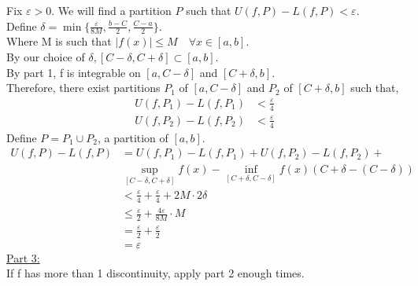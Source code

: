 \documentclass[12pt]{article}
\begin{document}
\begin{prf}{}
Fix \(\varepsilon > 0\). We will find a partition \(P\) such that \(U(f, P) - L(f, P) < \varepsilon\).\\
Define \(\delta = \min\{\frac{\varepsilon}{8M}, \frac{b - C}{2}, \frac{C - a}{2}\}\).\\
Where M is such that \(|f(x)| \le M \quad \forall x \in [a, b] \).\\
By our choice of \(\delta, [C-\delta, C+\delta] \subset [a, b]\).\\
By part 1, f is integrable on \([a, C-\delta]\) and \([C+\delta, b]\).\\
Therefore, there exist partitions \(P_1\) of \([a, C-\delta]\) and \(P_2\) of \([C+\delta, b]\) such that,
\begin{align*}
    U(f, P_1) - L(f, P_1) &< \frac{\varepsilon}{4}\\
    U(f, P_2) - L(f, P_2) &< \frac{\varepsilon}{4}
\end{align*}
Define \(P = P_1 \cup P_2\), a partition of \([a, b]\).\\
\begin{align*}
    U(f, P) - L(f, P) &= U(f, P_1) - L(f, P_1) + U(f, P_2) - L(f, P_2) +\\ &\displaystyle\sup_{[C-\delta, C+\delta]}f(x) - \displaystyle\inf_{[C+\delta, C-\delta]}f(x)(C+\delta - (C-\delta))\\
    &< \frac{\varepsilon}{4} + \frac{\varepsilon}{4} + 2M\cdot 2\delta\\
    &\le \frac{\varepsilon}{2} + \frac{4\varepsilon}{8M}\cdot M\\
    &= \frac{\varepsilon}{2} + \frac{\varepsilon}{2}\\
    &= \varepsilon
\end{align*}
\underline{Part 3:}\\
If f has more than 1 discontinuity, apply part 2 enough times.
\end{prf}

\newpage
\end{document}
